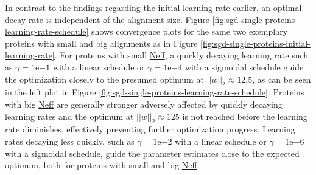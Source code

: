 \documentclass[12pt,a4paper,twoside]{book}
\newcommand{\eq}{\!=\!}
\theoremstyle{definition}
\theoremstyle{definition}
\theoremstyle{remark}
\begin{document}
In contrast to the findings regarding the initial learning rate earlier,
an optimal decay rate is independent of the alignment size. Figure
\ref{fig:sgd-single-proteins-learning-rate-schedule} shows convergence
plots for the same two exemplary proteins with small and big alignments
as in Figure \ref{fig:sgd-single-proteins-initial-learning-rate}. For
proteins with small \protect\hyperlink{abbrev}{Neff}, a quickly decaying
learning rate such as \(\gamma \eq 1\mathrm{e}{-1}\) with a linear
schedule or \(\gamma \eq 1\mathrm{e}{-4}\) with a sigmoidal schedule
guide the optimization closely to the presumed optimum at
\(||w||_2 \approx 12.5\), as can be seen in the left plot in Figure
\ref{fig:sgd-single-proteins-learning-rate-schedule}. Proteins with big
\protect\hyperlink{abbrev}{Neff} are generally stronger adversely
affected by quickly decaying learning rates and the optimum at
\(||w||_2 \approx 125\) is not reached before the learning rate
diminishes, effectively preventing further optimization progress.
Learning rates decaying less quickly, such as
\(\gamma \eq 1\mathrm{e}{-2}\) with a linear schedule or
\(\gamma \eq 1\mathrm{e}{-6}\) with a sigmoidal schedule, guide the
parameter estimates close to the expected optimum, both for proteins
with small and big \protect\hyperlink{abbrev}{Neff}.
\end{document}
